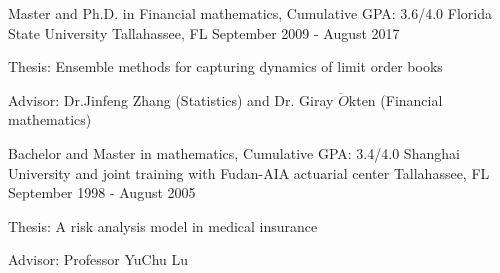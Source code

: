 \begin{cventries}
  \cventry
    {Master and Ph.D. in Financial mathematics, Cumulative GPA: 3.6/4.0}
    {Florida State University}
    {Tallahassee, FL}
    {September 2009 - August 2017}
	{
	\begin{cvitems}
	                \item{Thesis: Ensemble methods for capturing dynamics of limit order books}
	                \item {Advisor: Dr.Jinfeng Zhang (Statistics) and Dr. Giray $\ddot{O}$kten (Financial mathematics)}
	\end{cvitems}	
	}
 	 
 \cventry
     {Bachelor and Master in mathematics, Cumulative GPA: 3.4/4.0}
     {Shanghai University and joint training with Fudan-AIA actuarial center}
     {Tallahassee, FL}
     {September 1998 - August 2005}
 	{ 	
 	 	\begin{cvitems}
 	 		                \item{Thesis: A risk analysis model in medical insurance}
 	 		                \item {Advisor: Professor YuChu Lu}
 	 		\end{cvitems}
 	}      
\end{cventries}
